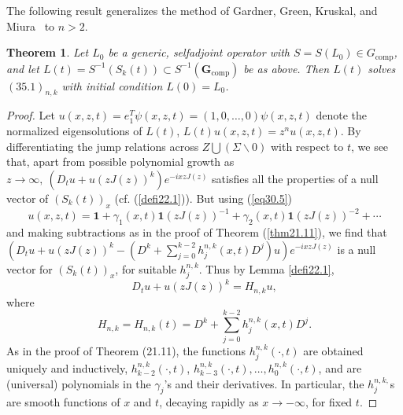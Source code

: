 \documentclass{surv-l}
\theoremstyle{plain}
\newtheorem{theorem}{Theorem}[section]
\theoremstyle{definition}
\numberwithin{equation}{chapter}
\begin{document}
The following result generalizes the method of Gardner, Green, Kruskal, and Miura~\cite{GGKM} to $n>2$.
\setcounter{theorem}{18}
\begin{theorem}\label{thm35.19}
Let $L_{0}$ be a generic, selfadjoint operator with $S=S(L_{0})\in G_{\mathrm{comp}}$, and let $L(t)=S^{-1}(S_{k}(t))\subset S^{-1}(\mathbf{G}_{\mathrm{comp}})$ be as above. Then $L(t)$ solves $(35.1)_{n,k}$ with initial condition $L(0)=L_{0}$.
\end{theorem}
\begin{proof}
Let $u(x, z, t)=e_{1}^{T}\psi(x, z, t)=(1, 0,\ldots,0)\psi(x, z, t)$ denote the normalized eigensolutions of $L(t)$, $L(t)u(x, z, t)=z^{n}u(x, z, t)$. By differentiating the jump relations across $Z\bigcup(\Sigma\backslash 0)$ with respect to $t$, we see that, apart from possible polynomial growth as $ z\rightarrow\infty,\ (D_{t}u+u(zJ(z))^{k})e^{-ixzJ(z)}$ satisfies all the properties of a null vector of $(S_{k}(t))_{x}$ (cf. (\ref{defi22.1})). But using (\ref{eq30.5})
\begin{equation*}
u(x, z, t)=\mathbf{1}+\gamma_{1}(x, t)\mathbf{1}(zJ(z))^{-1}+\gamma_{2}(x, t)\mathbf{1}(zJ(z))^{-2}+\cdots
\end{equation*}
and making subtractions as in the proof of Theorem (\ref{thm21.11}), we find that $(D_{t}u+u(zJ(z))^{k}-(D^{k}+\sum_{j=0}^{k-2}h_{j}^{n,k}(x, t)D^{j})u)e^{-ixzJ(z)}$ is a null vector for $(S_{k}(t))_{x}$, for suitable $h_{j}^{n,k}$. Thus by Lemma \ref{defi22.1},
\setcounter{equation}{19}
\begin{equation}\label{eq35.20}
D_{t}u+u(zJ(z))^{k}=H_{n,k}u,
\end{equation}
where
\begin{equation}\label{eq35.21}
H_{n,k}=H_{n,k}(t)=D^{k}+\sum_{j=0}^{k-2}h_{j}^{n,k}(x, t)D^{j}.
\end{equation}
As in the proof of Theorem (21.11), the functions $h_{j}^{n,k}(\cdot,t)$ are obtained uniquely and inductively, $h_{k-2}^{n,k}(\cdot,t)$, $ h_{k-3}^{n,k}(\cdot, t),\ldots,h_{0}^{n,k}(\cdot, t)$, and are (universal) polynomials in the $\gamma_{j}$'s and their derivatives. In particular, the $h_{j}^{n,k,}$s are smooth functions of $x$ and $t$, decaying rapidly as $x\rightarrow-\infty$, for fixed $t$.


\end{proof}
\end{document}

